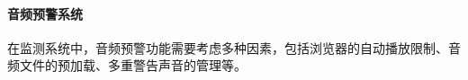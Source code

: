 \begin{Shaded}
\begin{Highlighting}[]
\NormalTok{(}\OperatorTok{,}\NormalTok{ () }\KeywordTok{=\textgreater{}} \NormalTok{(}\NormalTok{))}\OperatorTok{;}
\NormalTok{(}\OperatorTok{,}\NormalTok{ () }\KeywordTok{=\textgreater{}} \NormalTok{(}\NormalTok{))}\OperatorTok{;}
\NormalTok{(}\OperatorTok{,}\NormalTok{ () }\KeywordTok{=\textgreater{}} \NormalTok{(}\NormalTok{))}\OperatorTok{;}
\DataTypeTok{\textless{}/}\DataTypeTok{\textgreater{}}
\end{Highlighting}
\end{Shaded}

\paragraph{音频预警系统}\label{ux97f3ux9891ux9884ux8b66ux7cfbux7edf}

在监测系统中，音频预警功能需要考虑多种因素，包括浏览器的自动播放限制、音频文件的预加载、多重警告声音的管理等。

